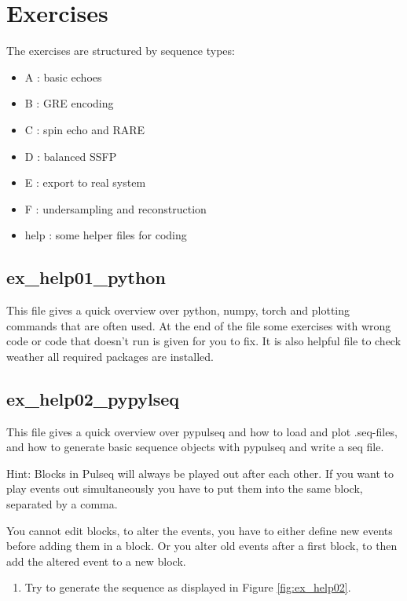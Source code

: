 \documentclass[a4paper,12pt]{extarticle}
\begin{document}
\section{Exercises}
\vspace{7.5cm}
The exercises are structured by sequence types:
\begin{itemize}
\item A : basic echoes 
\item B : GRE encoding
\item C : spin echo and RARE
\item D : balanced SSFP
\item E : export to real system
\item F : undersampling and reconstruction
\item help : some helper files for coding
\end{itemize}

\subsection{ex\_help01\_python}
This file gives a quick overview over python, numpy, torch and plotting commands that are often used.
At the end of the file some exercises with wrong code or code that doesn't run is given for you to fix.
It is also helpful file to check weather all required packages are installed. 

\subsection{ex\_help02\_pypylseq}
This file gives a quick overview over pypulseq and how to load and plot .seq-files, and how to generate basic sequence objects with pypulseq and write a seq file.

Hint: Blocks in Pulseq will always be played out after each other. If you want to play events out simultaneously you have to put them into the same block, separated by a comma.

You cannot edit blocks, to alter the events, you have to either define new events before adding them in a block. Or you alter old events after a first block, to then add the altered event to a new block.

\begin{enumerate}

\item 	Try to generate the sequence as displayed in Figure \ref{fig:ex_help02}. 

\end{enumerate}
\end{document}
